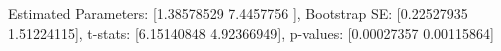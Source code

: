 Estimated Parameters: [1.38578529 7.4457756 ], Bootstrap SE: [0.22527935 1.51224115], t-stats: [6.15140848 4.92366949], p-values: [0.00027357 0.00115864]